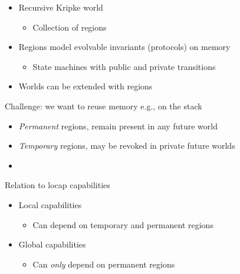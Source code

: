 \documentclass{beamer}
\begin{document}
\begin{frame}
\begin{overprint}
  \end{overprint}
  \begin{overprint}
    \begin{itemize}
    \item Recursive Kripke world
      \begin{itemize}
      \item Collection of regions
      \end{itemize}
    \item Regions model evolvable invariants (protocols) on memory
      \begin{itemize}
      \item State machines with public and private transitions
      \end{itemize}
    \item<3-> Worlds can be extended with regions
    \end{itemize}
    Challenge: we want to reuse memory e.g., on the stack
      \begin{itemize}
      \item \emph{Permanent} regions, remain present in any future world
      \item \emph{Temporary} regions, may be revoked in private future worlds
      \item {}
      \end{itemize}
    Relation to locap capabilities
    \begin{itemize}
    \item<9-> Local capabilities
      \begin{itemize}
      \item Can depend on temporary and permanent regions
      \end{itemize}
    \item<10-> Global capabilities
      \begin{itemize}
      \item Can \emph{only} depend on permanent regions
      \end{itemize}
    \end{itemize}
  \end{overprint}
\end{frame}
\end{document}

